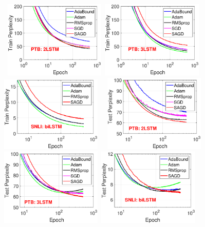 \documentclass[11pt]{article}
\begin{document}
\begin{figure}[t]
\mbox{
\includegraphics[width=1.9in]{fig2/PTB_2layer_train.eps}
\hspace{-0.12in}
\includegraphics[width=1.9in]{fig2/PTB_3layer_train.eps}
\hspace{-0.12in}
\includegraphics[width=1.9in]{fig2/SNLI_bilstm_train.eps}
}
\mbox{
\includegraphics[width=1.9in]{fig2/PTB_2layer_test.eps}
\hspace{-0.12in}
\includegraphics[width=1.9in]{fig2/PTB_3layer_test.eps}
\hspace{-0.12in}
\includegraphics[width=1.9in]{fig2/SNLI_bilstm_test.eps}
}
\end{figure}
\end{document}
